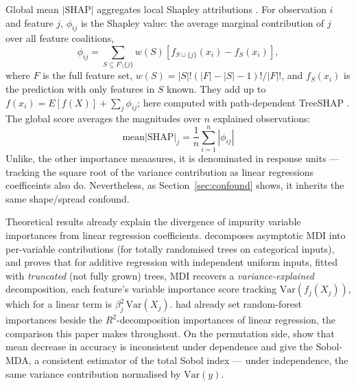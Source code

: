 Global mean $|\text{SHAP}|$ aggregates local Shapley attributions
\citep{lundberg2017}. For observation $i$ and feature $j$,
$\phi_{ij}$ is the Shapley value: the average marginal
contribution of $j$ over all feature coalitions,
%
\begin{equation}
\phi_{ij} = \sum_{S \subseteq F \setminus \{j\}} w(S)
\left[f_{S \cup \{j\}}(x_i) - f_S(x_i)\right],
\end{equation}
%
\noindent
where $F$ is the full feature set,
$w(S) = |S|!(|F| - |S| - 1)!/|F|!$, and $f_S(x_i)$ is the
prediction with only features in $S$ known. They add up to
$f(x_i) = E[f(X)] + \sum_j \phi_{ij}$; here computed with
path-dependent TreeSHAP \citep{lundberg2020}. The global score
averages the magnitudes over $n$ explained observations:
%
\begin{equation}
\text{mean}|\text{SHAP}|_j = \frac{1}{n}\sum_{i=1}^{n} |\phi_{ij}|
\end{equation}
%
\noindent
Unlike, the other importance meaasures, 
it is denominated in response units --- tracking the square root of
the variance contribution as linear regressions coefficeints also do.
Nevertheless, as Section~\ref{sec:confound}
shows, it inherits the same shape/spread confound.

Theoretical results already explain the divergence of impurity variable importances from linear regression
coefficients.
\citet{louppe2013}
decomposes asymptotic MDI into per-variable contributions (for totally
randomised trees on categorical inputs), and \citet{scornet2023} proves that for
additive regression with independent uniform inputs, fitted with
\emph{truncated} (not fully grown) trees, MDI recovers a
\emph{variance-explained} decomposition, each
feature's variable importance score tracking $\mathrm{Var}(f_j(X_j))$,
which for a linear term is
$\beta_j^2\,\mathrm{Var}(X_j)$. \citet{gromping2009} had already set
random-forest importances beside the $R^2$-decomposition importances of linear
regression, the comparison this paper makes throughout.
On the permutation
side, \citet{benard2022} show that mean decrease in accuracy is inconsistent
under dependence and give the Sobol-MDA, a consistent estimator of the total
Sobol index --- under independence, the same variance contribution normalised
by $\mathrm{Var}(y)$.


